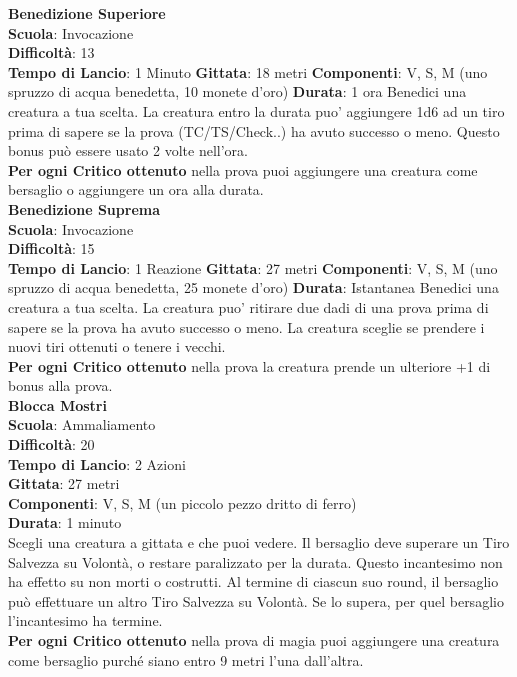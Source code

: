\begin{multicols}{2}
\medskip\textbf{Benedizione Superiore}\\
\textbf{Scuola}: Invocazione\\
\textbf{Difficoltà}:  13\\
\textbf{Tempo di Lancio}: 1 Minuto
\textbf{Gittata}: 18 metri
\textbf{Componenti}: V, S, M (uno spruzzo di acqua benedetta, 10 monete d'oro)
\textbf{Durata}: 1 ora
Benedici una creatura a tua scelta. La creatura entro la durata puo' aggiungere 1d6 ad un tiro prima di sapere se la prova (TC/TS/Check..) ha avuto successo o meno. Questo bonus può essere usato 2 volte nell'ora.\\
\textbf{Per ogni Critico ottenuto} nella prova puoi aggiungere una creatura come bersaglio o aggiungere un ora alla durata.\\

\medskip\textbf{Benedizione Suprema}\\
\textbf{Scuola}: Invocazione\\
\textbf{Difficoltà}:  15\\
\textbf{Tempo di Lancio}: 1 Reazione
\textbf{Gittata}: 27 metri
\textbf{Componenti}: V, S, M (uno spruzzo di acqua benedetta, 25 monete d'oro)
\textbf{Durata}: Istantanea
Benedici una creatura a tua scelta. La creatura puo' ritirare due dadi di una prova prima di sapere se la prova ha avuto successo o meno. La creatura sceglie se prendere i nuovi tiri ottenuti o tenere i vecchi.\\
\textbf{Per ogni Critico ottenuto} nella prova la creatura prende un ulteriore +1 di bonus alla prova.\\

\medskip\textbf{Blocca Mostri}\\
\textbf{Scuola}: Ammaliamento\\
\textbf{Difficoltà}:  20\\
\textbf{Tempo di Lancio}: 2 Azioni\\
\textbf{Gittata}: 27 metri\\
\textbf{Componenti}: V, S, M (un piccolo pezzo dritto di ferro)\\
\textbf{Durata}: 1 minuto\\
Scegli una creatura a gittata e che puoi vedere. Il bersaglio deve superare un Tiro Salvezza su Volontà, o restare paralizzato per la durata. Questo incantesimo non ha effetto su non morti o costrutti. Al termine di ciascun suo round, il bersaglio può effettuare un altro Tiro Salvezza su Volontà. Se lo supera, per quel bersaglio l'incantesimo ha termine.\\
\textbf{Per ogni Critico ottenuto} nella prova di magia puoi aggiungere una creatura come bersaglio purché siano entro 9 metri l’una dall'altra.



\end{multicols}
